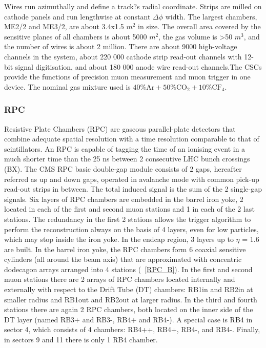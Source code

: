 Wires run azimuthally and define a track?s radial coordinate. Strips are milled on cathode panels and run lengthwise at constant $\Delta \phi$ width. The largest chambers, ME2/2 and ME3/2, are about 3.4x1.5 $m^{2}$ in size. The overall area covered by the sensitive planes of all chambers is about 5000 $m^{2}$, the gas volume is >50 $m^{3}$, and the number of wires is about 2 million. There are about 9000 high-voltage channels in the system, about 220 000 cathode strip read-out channels with 12-bit signal digitisation, and about 180 000 anode wire read-out channels.The CSCs provide the functions of precision muon measurement and muon trigger in one device. The nominal gas mixture used is 
$\mathrm{40\%Ar + 50\%CO_{2} + 10\%CF_{4}.}$

\subsubsection{RPC}
Resistive Plate Chambers (RPC) are gaseous parallel-plate detectors that combine adequate spatial resolution with a time resolution comparable to that of scintillators. An RPC is capable of tagging the time of an ionising event in a much shorter time than the 25 ns between 2 consecutive LHC bunch crossings (BX). The CMS RPC basic double-gap module consists of 2 gaps, hereafter referred as up and down gaps, operated in avalanche mode with common pick-up read-out strips in between. The total induced signal is the sum of the 2 single-gap signals.  Six layers of RPC chambers are embedded in the barrel iron yoke, 2 located in each of the first and second muon stations and 1 in each of the 2 last stations. The redundancy in the first 2 stations allows the trigger algorithm to perform the reconstruction always on the basis of 4 layers, even for low \pt particles, which may stop inside the iron yoke. In the endcap region, 3 layers up to $\eta$ = 1.6 are built. In the barrel iron yoke, the RPC chambers form 6 coaxial sensitive cylinders (all around the beam axis) that are approximated with concentric dodecagon arrays arranged into 4 stations (\figurename~\ref{RPC_B}). In the first and second muon stations there are 2 arrays of RPC chambers located internally and externally with respect to the Drift Tube (DT) chambers: RB1in and RB2in at smaller radius and RB1out and RB2out at larger radius. In the third and fourth stations there are again 2 RPC chambers, both located on the inner side of the DT layer (named RB3+ and RB3-, RB4+ and RB4-). A special case is RB4 in sector 4, which consists of 4 chambers: RB4++, RB4+, RB4-, and RB4-. Finally, in sectors 9 and 11 there is only 1 RB4 chamber.
